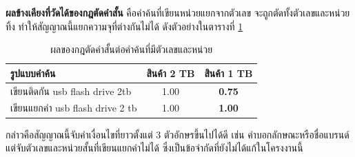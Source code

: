 \textbf{ผลข้างเคียงที่วัดได้ของกฎตัดคำสั้น} คือคำค้นที่เขียนหน่วยแยกจากตัวเลข
จะถูกตัดทั้งตัวเลขและหน่วยทิ้ง ทำให้สัญญาณนี้แยกความจุที่ต่างกันไม่ได้
ดังตัวอย่างในตารางที่ \ref{tab:wordcount_limit}

\begin{table}[H]
\centering
\caption{ผลของกฎตัดคำสั้นต่อคำค้นที่มีตัวเลขและหน่วย}
\label{tab:wordcount_limit}
\small
\begin{tabular}{|l|c|c|}
\hline
\textbf{รูปแบบคำค้น} & \textbf{สินค้า 2 TB} & \textbf{สินค้า 1 TB} \\
\hline
เขียนติดกัน \quad usb flash drive 2tb & 1.00 & \textbf{0.75} \\ \hline
เขียนแยกคำ \quad usb flash drive 2 tb & 1.00 & \textbf{1.00} \\
\hline
\end{tabular}
\end{table}

กล่าวคือสัญญาณนี้จับคำเงื่อนไขที่ยาวตั้งแต่ 3 ตัวอักษรขึ้นไปได้ดี
เช่น คำบอกลักษณะหรือชื่อแบรนด์ แต่จับตัวเลขและหน่วยสั้นที่เขียนแยกคำไม่ได้
ซึ่งเป็นข้อจำกัดที่ยังไม่ได้แก้ในโครงงานนี้
